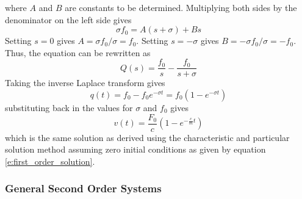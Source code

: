 where $A$ and $B$ are constants to be determined. Multiplying both sides by the denominator on the left side gives
\begin{equation}
    \sigma f_0 = A(s+\sigma) + Bs
\end{equation}
Setting $s=0$ gives $A=\sigma f_0/\sigma = f_0$. Setting $s=-\sigma$ gives $B=-\sigma f_0/\sigma = -f_0$. Thus, the equation can be rewritten as
\begin{equation}
    Q(s) = \frac{f_0}{s} - \frac{f_0}{s+\sigma}
\end{equation}
Taking the inverse Laplace transform gives
\begin{equation}
    q(t) = f_0 - f_0 e^{-\sigma t} = f_0(1 - e^{-\sigma t})
\end{equation}
substituting back in the values for $\sigma$ and $f_0$ gives
\begin{equation}
    v(t) = \frac{F_0}{c}(1 - e^{-\frac{c}{m}t})
\end{equation}
which is the same solution as derived using the characteristic and particular solution method assuming zero initial conditions as given by equation \ref{e:first_order_solution}.

\subsubsection{General Second Order Systems}


